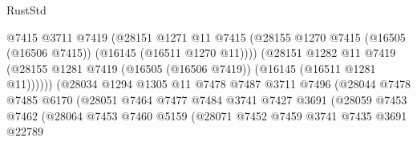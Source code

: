 \begin{lexlean}{RustStd}
\begin{coremodule}
                                      @7415
                                      @3711
                                      @7419
                                      (@28151
                                        @1271
                                        @11
                                        @7415
                                        (@28155
                                          @1270
                                          @7415
                                          (@16505 (@16506 @7415))
                                          (@16145 (@16511 @1270 @11))))
                                      (@28151
                                        @1282
                                        @11
                                        @7419
                                        (@28155
                                          @1281
                                          @7419
                                          (@16505 (@16506 @7419))
                                          (@16145 (@16511 @1281 @11))))))
                                  (@28034
                                    @1294
                                    @1305
                                    @11
                                    @7478
                                    @7487
                                    @3711
                                    @7496
                                    (@28044
                                      @7478
                                      @7485
                                      @6170
                                      (@28051
                                        @7464
                                        @7477
                                        @7484
                                        @3741
                                        @7427
                                        @3691
                                        (@28059
                                          @7453
                                          @7462
                                          (@28064
                                            @7453
                                            @7460
                                            @5159
                                            (@28071
                                              @7452
                                              @7459
                                              @3741
                                              @7435
                                              @3691
                                              @22789

\end{coremodule}
\end{lexlean}
